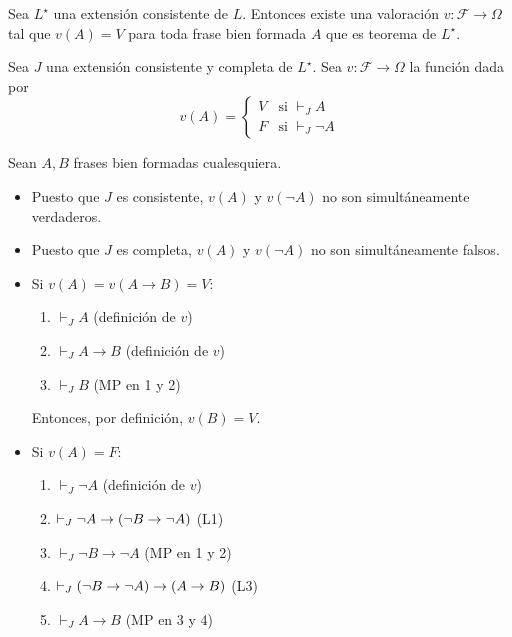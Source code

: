 \begin{proposition}
Sea $L^\star$ una extensión consistente de $L$. Entonces existe una valoración $v : \mathscr F \to \Omega$ tal que $v(A) = V$ para toda frase bien formada $A$ que es teorema de $L^\star$.
\end{proposition}

\begin{prove}
Sea $J$ una extensión consistente y completa de $L^\star$. Sea $v : \mathscr F \to \Omega$ la función dada por
$$
v(A) =
    \begin{cases}
        V & \text{si } \vdash_J A \\
        F & \text{si } \vdash_J \neg A
    \end{cases}
$$

Sean $A,B$ frases bien formadas cualesquiera.
\begin{itemize}
    \item Puesto que $J$ es consistente, $v(A)$ y $v(\neg A)$ no son simultáneamente verdaderos.
    
    \item Puesto que $J$ es completa, $v(A)$ y $v(\neg A)$ no son simultáneamente falsos.
    
    \item Si $v(A) = v(A \to B) = V$:
    \begin{enumerate}
        \item $\vdash_J A$       \hfill (definición de $v$)
        \item $\vdash_J A \to B$ \hfill (definición de $v$)
        \item $\vdash_J B$       \hfill (MP en 1 y 2)
    \end{enumerate}
    
    Entonces, por definición, $v(B) = V$.

    \item Si $v(A) = F$:
    \begin{enumerate}
        \item $\vdash_J \neg A$                  \hfill (definición de $v$)
        \item $\vdash_J \neg A \to (\neg B \to \neg A)$ \hfill (L1)
        \item $\vdash_J      \neg B \to \neg A$  \hfill (MP en 1 y 2)
        \item $\vdash_J (\neg B \to \neg A) \to (A \to B)$                  \hfill (L3)
        \item $\vdash_J A \to B$                 \hfill (MP en 3 y 4)
    \end{enumerate}
    

\end{itemize}
\end{prove}

